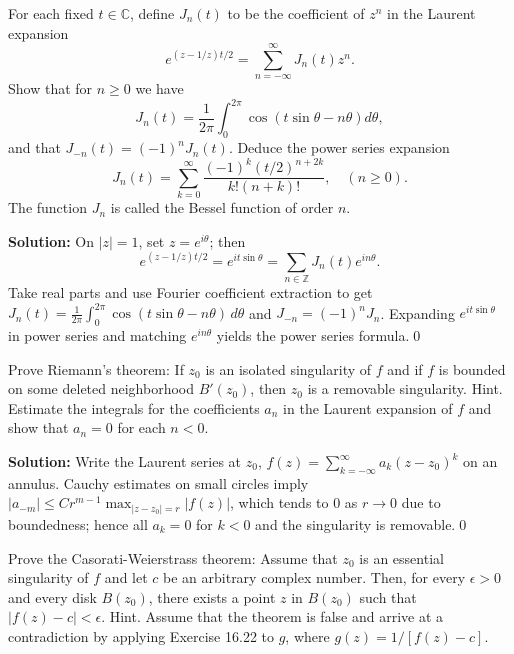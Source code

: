 \begin{problembox}
For each fixed \( t \in \mathbb{C} \), define \( J_n(t) \) to be the coefficient of \( z^n \) in the Laurent expansion
\[ e^{(z - 1/z)t/2} = \sum_{n=-\infty}^{\infty} J_n(t) z^n. \]
Show that for \( n \geq 0 \) we have
\[ J_n(t) = \frac{1}{2\pi} \int_0^{2\pi} \cos (t \sin \theta - n \theta) d\theta, \]
and that \( J_{-n}(t) = (-1)^n J_n(t) \). Deduce the power series expansion
\[ J_n(t) = \sum_{k=0}^{\infty} \frac{(-1)^k (t/2)^{n + 2k}}{k! (n + k)!}, \quad (n \geq 0). \]
The function \( J_n \) is called the Bessel function of order \( n \).
\end{problembox}

\noindent\textbf{Solution:}
On $|z|=1$, set $z=e^{i\theta}$; then
\[e^{(z-1/z)t/2}=e^{i t\sin\theta}=\sum_{n\in\mathbb Z} J_n(t)e^{in\theta}.
\]
Take real parts and use Fourier coefficient extraction to get $J_n(t)=\frac{1}{2\pi}\int_0^{2\pi}\cos(t\sin\theta-n\theta)\,d\theta$ and $J_{-n}=(-1)^nJ_n$. Expanding $e^{i t\sin\theta}$ in power series and matching $e^{in\theta}$ yields the power series formula.\qed


\begin{problembox}
Prove Riemann's theorem: If \( z_0 \) is an isolated singularity of \( f \) and if \( f \) is bounded on some deleted neighborhood \( B'(z_0) \), then \( z_0 \) is a removable singularity. Hint. Estimate the integrals for the coefficients \( a_n \) in the Laurent expansion of \( f \) and show that \( a_n = 0 \) for each \( n < 0 \).
\end{problembox}

\noindent\textbf{Solution:}
Write the Laurent series at $z_0$, $f(z)=\sum_{k=-\infty}^{\infty} a_k(z-z_0)^k$ on an annulus. Cauchy estimates on small circles imply $|a_{-m}|\le C r^{m-1}\max_{|z-z_0|=r}|f(z)|$, which tends to $0$ as $r\to0$ due to boundedness; hence all $a_{k}=0$ for $k<0$ and the singularity is removable.\qed


\begin{problembox}
Prove the Casorati-Weierstrass theorem: Assume that \( z_0 \) is an essential singularity of \( f \) and let \( c \) be an arbitrary complex number. Then, for every \( \epsilon > 0 \) and every disk \( B(z_0) \), there exists a point \( z \) in \( B(z_0) \) such that \( |f(z) - c| < \epsilon \). Hint. Assume that the theorem is false and arrive at a contradiction by applying Exercise 16.22 to \( g \), where \( g(z) = 1/[f(z) - c] \).
\end{problembox}

